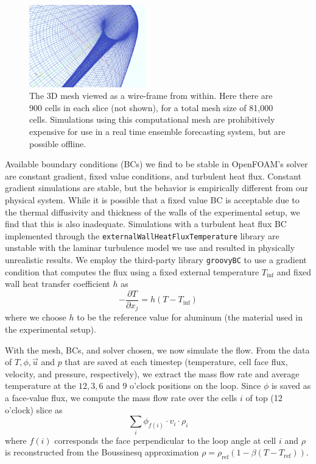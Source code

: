 \documentclass[pre,twocolumn,twoside,byrevtex,superscriptaddress]{revtex4}
\newcommand{\partialdiff}[2]{\frac{\partial #1}{\partial #2}}
\newcommand{\rhoref}{\rho_{\text{ref}}}
\begin{document}
\begin{figure}[h]
  \centering
  \includegraphics[width=0.45\textwidth]{fig04_3D-mesh2.pdf}
  \caption[The 3D mesh viewed as a wire-frame from within]{
    The 3D mesh viewed as a wire-frame from within.
    Here there are 900 cells in each slice (not shown), for a total mesh size of 81,000 cells.
    Simulations using this computational mesh are prohibitively expensive for use in a real time ensemble forecasting system, but are possible offline.
  }
  \label{fig:CFDmesh2}
\end{figure}

Available boundary conditions (BCs) we find to be stable in OpenFOAM's solver are constant gradient, fixed value conditions, and turbulent heat flux.
Constant gradient simulations are stable, but the behavior is empirically different from our physical system.
While it is possible that a fixed value BC is acceptable due to the thermal diffusivity and thickness of the walls of the experimental setup, we find that this is also inadequate.
Simulations with a turbulent heat flux BC implemented through the \verb|externalWallHeatFluxTemperature| library are unstable with the laminar turbulence model we use and resulted in physically unrealistic results.
We employ the third-party library \verb|groovyBC| to use a gradient condition that computes the flux using a fixed external temperature $T_\text{inf}$ and fixed wall heat transfer coefficient $h$ as $$ - \partialdiff{T}{x_j} = h \left( T-T_\text{inf} \right)$$ where we choose $h$ to be the reference value for aluminum (the material used in the experimental setup).

With the mesh, BCs, and solver chosen, we now simulate the flow.
From the data of $T,\phi,\vec{u}$ and $p$ that are saved at each timestep (temperature, cell face flux, velocity, and pressure, respectively), we extract the mass flow rate and average temperature at the $12,3,6$ and $9$ o'clock positions on the loop.
Since $\phi$ is saved as a face-value flux, we compute the mass flow rate over the cells $i$ of top (12 o'clock) slice as
\begin{equation} \sum _i\phi_{f(i)} \cdot v_i \cdot \rho_i\end{equation}
where $f(i)$ corresponds the face perpendicular to the loop angle at cell $i$ and $\rho$ is reconstructed from the Boussinesq approximation $\rho = \rhoref (1-\beta(T-T_\text{ref}))$.
\end{document}
